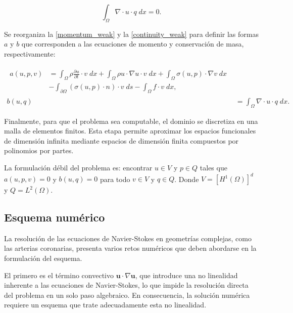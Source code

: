 \documentclass[12pt, letterpaper]{article}
\begin{document}
\begin{center}
  \begin{equation}
    \label{continuity_weak}
    \int_{\Omega}\nabla \cdot u \cdot q \; dx = 0.
  \end{equation}
\end{center}
\vspace{6pt}

Se reorganiza la \cref{momentum_weak} y la \cref{continuity_weak} para definir las formas $a$ y $b$ que corresponden a las ecuaciones de momento y conservación de masa, respectivamente:

\begin{center}
  \begin{align}
    \label{bilinear_mom}
    \begin{split}
      a(u, p, v) &= \int_{\Omega}\rho\frac{\partial u}{\partial t}\cdot v \; dx + \int_{\Omega} \rho u \cdot \nabla u \cdot v \; dx + \int_{\Omega}\sigma(u,p) \cdot \nabla v \; dx \\
      &- \int_{\partial \Omega}(\sigma(u,p) \cdot n) \cdot v \; ds - \int_{\Omega}f \cdot v \; dx,
    \end{split}\\
    \label{bilinear_con}
    b(u, q) &= \int_{\Omega}\nabla \cdot u \cdot q \; dx.
  \end{align}
\end{center}
\vspace{6pt}

Finalmente, para que el problema sea computable, el dominio se discretiza en una malla de elementos finitos. Esta etapa permite aproximar los espacios funcionales de dimensión infinita mediante espacios de dimensión finita compuestos por polinomios por partes.

La formulación débil del problema es: encontrar $u \in V$ y $p \in Q$ tales que $a(u,p,v)=0$ y $b(u,q) = 0$ para todo $v \in V$ y $q \in Q$. Donde $V = [H^1(\Omega)]^d$ y $Q = L^2(\Omega)$.

\subsection{Esquema numérico}

La resolución de las ecuaciones de Navier-Stokes en geometrías complejas, como las arterias coronarias, presenta varios retos numéricos que deben abordarse en la formulación del esquema.

El primero es el término convectivo $\mathbf{u} \cdot \nabla \mathbf{u}$, que introduce una no linealidad inherente a las ecuaciones de Navier-Stokes, lo que impide la resolución directa del problema en un solo paso algebraico. En consecuencia, la solución numérica requiere un esquema que trate adecuadamente esta no linealidad.
\end{document}
